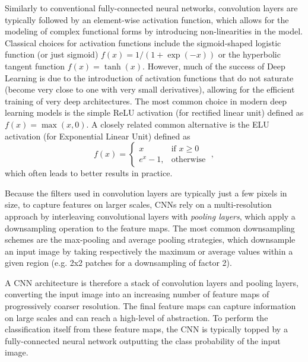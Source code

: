 \documentclass{aa}
\begin{document}
Similarly to conventional fully-connected neural networks, convolution layers are typically followed  by an element-wise activation function, which allows for the modeling of complex functional forms  by introducing non-linearities in the model.  Classical choices  for  activation functions  include the sigmoid-shaped logistic  function (or just sigmoid) $f(x) = 1/ (1  + \exp(-x))$ or the hyperbolic tangent function $f(x) = \tanh(x)$. However, much of the success of Deep Learning is due to the  introduction of activation functions that do not saturate (become very close to one with very small derivatives), allowing for the  efficient training  of very deep architectures. The most common choice in modern deep learning models  is the simple ReLU activation (for rectified linear unit) \citep{Nair2010} defined as $f(x) = \max(x, 0 )$. A closely related  common alternative is the ELU activation (for Exponential Linear Unit) \citep{2015arXiv151107289C} defined as 
\begin{equation}
	f(x ) = \begin{cases}
    x & \text{if } x\geq 0\\
    e^{x } - 1,              & \text{otherwise}
\end{cases}\;,
\end{equation}
which often leads to better results in practice.

Because the filters used in convolution layers are  typically  just a few pixels in size, to capture features on larger scales, CNNs rely on a multi-resolution approach by interleaving convolutional layers with \textit{pooling layers}, which apply a downsampling operation to the feature maps. The most common downsampling schemes are the max-pooling and average pooling strategies, which downsample an input image by taking respectively the maximum or average values within a given region (e.g. 2x2 patches for a downsampling of factor 2).

A CNN architecture is therefore a stack of convolution layers and pooling layers, converting the input image into an increasing number of feature maps of progressively coarser resolution. The final feature maps can capture information on large scales and can reach a high-level of abstraction. To perform the classification itself from these feature maps, the CNN is typically topped by a fully-connected neural network outputting the class probability of the input image.
\end{document}

